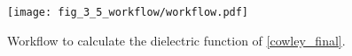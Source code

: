 \begin{figure}[htb]
 \centering
  \texttt{[image: fig\_3\_5\_workflow/workflow.pdf]}
  \caption{Workflow to calculate the dielectric function of \cref{cowley_final}.}
\label{Fig:workflow_cowley}
\end{figure}

